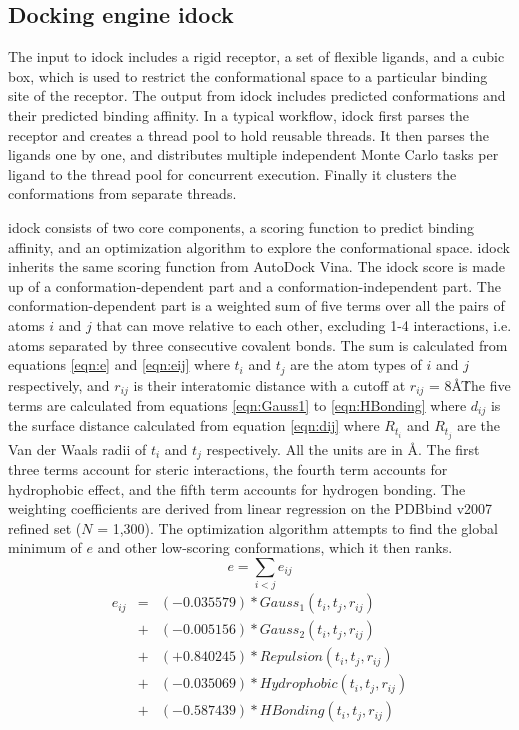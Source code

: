 \documentclass[10pt]{article}
\begin{document}
\subsection*{Docking engine idock}
The input to idock includes a rigid receptor, a set of flexible ligands, and a cubic box, which is used to restrict the conformational space to a particular binding site of the receptor. The output from idock includes predicted conformations and their predicted binding affinity. In a typical workflow, idock first parses the receptor and creates a thread pool to hold reusable threads. It then parses the ligands one by one, and distributes multiple independent Monte Carlo tasks per ligand to the thread pool for concurrent execution. Finally it clusters the conformations from separate threads.

idock consists of two core components, a scoring function to predict binding affinity, and an optimization algorithm to explore the conformational space. idock inherits the same scoring function from AutoDock Vina. The idock score is made up of a conformation-dependent part and a conformation-independent part. The conformation-dependent part is a weighted sum of five terms over all the pairs of atoms $i$ and $j$ that can move relative to each other, excluding 1-4 interactions, i.e. atoms separated by three consecutive covalent bonds. The sum is calculated from equations \eqref{eqn:e} and \eqref{eqn:eij} where $t_i$ and $t_j$ are the atom types of $i$ and $j$ respectively, and $r_{ij}$ is their interatomic distance with a cutoff at $r_{ij}$ = 8\AA\. The five terms are calculated from equations \eqref{eqn:Gauss1} to \eqref{eqn:HBonding} where $d_{ij}$ is the surface distance calculated from equation \eqref{eqn:dij} where $R_{t_i}$ and $R_{t_j}$ are the Van der Waals radii of $t_i$ and $t_j$ respectively. All the units are in \AA. The first three terms account for steric interactions, the fourth term accounts for hydrophobic effect, and the fifth term accounts for hydrogen bonding. The weighting coefficients are derived from linear regression on the PDBbind \cite{529,530} v2007 refined set ($N$ = 1,300). The optimization algorithm attempts to find the global minimum of $e$ and other low-scoring conformations, which it then ranks.
\begin{equation}
\label{eqn:e}
e = \sum_{i < j} e_{ij}
\end{equation}
\begin{eqnarray}
\label{eqn:eij}
e_{ij} &=& (-0.035579) * Gauss_1(t_i, t_j, r_{ij}) \nonumber \\
       &+& (-0.005156) * Gauss_2(t_i, t_j, r_{ij}) \nonumber \\
       &+& (+0.840245) * Repulsion(t_i, t_j, r_{ij}) \nonumber \\
       &+& (-0.035069) * Hydrophobic(t_i, t_j, r_{ij}) \nonumber \\
       &+& (-0.587439) * HBonding(t_i, t_j, r_{ij})
\end{eqnarray}
\end{document}

